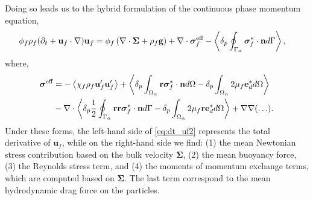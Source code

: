 Doing so leads us to the hybrid formulation of the continuous phase momentum  equation, %
\begin{align}
    \phi_f \rho_f(\pddt + \textbf{u}_f  \cdot \grad) \textbf{u}_f
    &= \phi_f 
    \left(\div \bm{\Sigma}
    + \rho_f \textbf{g}\right)
    + \div \bm\sigma_f^{\text{eff}}
    - \pSavg{\bm\sigma_f^{*}\cdot \textbf{n}}, 
    \label{eq:dt_uf2}
\end{align}
where,
\begin{align}
    \bm{\sigma}^{\text{eff}} 
    &= 
    - \avg{\chi_f\rho_f \textbf{u}_f'\textbf{u}_f'} 
    + \pavg{\intO{\textbf{r}\bm\sigma^{*}_f\cdot \textbf{n}} - \delta_p\intO{2\mu_f\textbf{e}_d^*}}\nonumber\\
    &- \div
        \pavg{ \frac{1}{2}\intS{\textbf{rr}\bm\sigma^{*}_f\cdot \textbf{n}}
        - \delta_p\intO{2\mu_f \textbf{r} \textbf{e}_d^*}}
        + \grad\grad (\ldots). 
    \label{eq:def_sigma_eff_f2}
\end{align}
Under these forms, the left-hand side of \ref{eq:dt_uf2} represents the total derivative of $\textbf{u}_f$, while on the right-hand side we find: (1) the mean Newtonian stress contribution based on the bulk velocity $\bm\Sigma$, (2) the mean buoyancy force, (3) the Reynolds stress term, and (4) the moments of momentum exchange terms, which are computed based on $\bm\Sigma$. 
The last term correspond to the mean hydrodynamic drag force on the particles.

